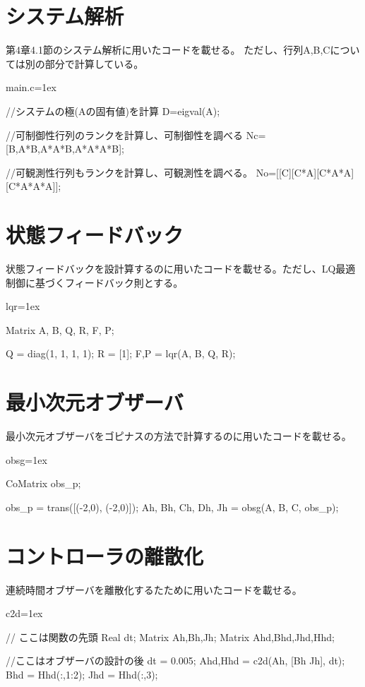 \section{システム解析}
	第4章4.1節のシステム解析に用いたコードを載せる。
	ただし、行列A,B,Cについては別の部分で計算している。
	\begin{itembox}[l]{main.c}\baselineskip=1ex
		\begin{verbatimtab}[4]
//システムの極(Aの固有値)を計算
D=eigval(A);

//可制御性行列のランクを計算し、可制御性を調べる
Nc=[B,A*B,A*A*B,A*A*A*B];

//可観測性行列もランクを計算し、可観測性を調べる。
No=[[C][C*A][C*A*A][C*A*A*A]];
		\end{verbatimtab}
	\end{itembox}
\section{状態フィードバック}
	状態フィードバックを設計算するのに用いたコードを載せる。ただし、LQ最適制御に基づくフィードバック則とする。
	\begin{itembox}[l]{lqr}\baselineskip=1ex
		\begin{verbatimtab}[4]
Matrix A, B, Q, R, F, P;

Q = diag(1, 1, 1, 1);
R = [1];
{F,P} = lqr(A, B, Q, R);
		\end{verbatimtab}
	\end{itembox}
\section{最小次元オブザーバ}
	最小次元オブザーバをゴピナスの方法で計算するのに用いたコードを載せる。
	\begin{itembox}[l]{obsg}\baselineskip=1ex
		\begin{verbatimtab}[4]
CoMatrix obs_p;

obs_p = trans([(-2,0), (-2,0)]);
{Ah, Bh, Ch, Dh, Jh} = obsg(A, B, C, obs_p);
		\end{verbatimtab}
	\end{itembox}
\section{コントローラの離散化}
	連続時間オブザーバを離散化するたために用いたコードを載せる。
	\begin{itembox}[l]{c2d}\baselineskip=1ex
		\begin{verbatimtab}[4]
// ここは関数の先頭
Real dt;
Matrix Ah,Bh,Jh;
Matrix Ahd,Bhd,Jhd,Hhd;

//ここはオブザーバの設計の後
dt = 0.005;
{Ahd,Hhd} = c2d(Ah, [Bh Jh], dt);
Bhd = Hhd(:,1:2);
Jhd = Hhd(:,3);
		\end{verbatimtab}
	\end{itembox}
